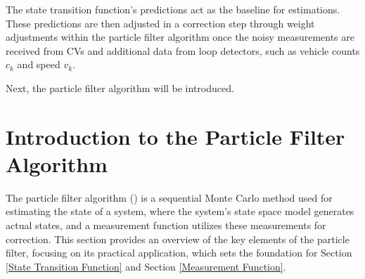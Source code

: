 The state transition function's predictions act as the baseline for estimations. These predictions are then adjusted in a correction step through weight adjustments within the particle filter algorithm once the noisy measurements are received from CVs and additional data from loop detectors, such as vehicle counts $c_k$ and speed $v_k$.

Next, the particle filter algorithm will be introduced.


\section{Introduction to the Particle Filter Algorithm}\label{Introduction to the Particle Filter Algorithm}

The particle filter algorithm (\textcite{arulampalam2002tutorial}) is a sequential Monte Carlo method used for estimating the state of a system, where the system's state space model generates actual states, and a measurement function utilizes these measurements for correction. This section provides an overview of the key elements of the particle filter, focusing on its practical application, which sets the foundation for Section \ref{State Transition Function} and Section \ref{Measurement Function}.

